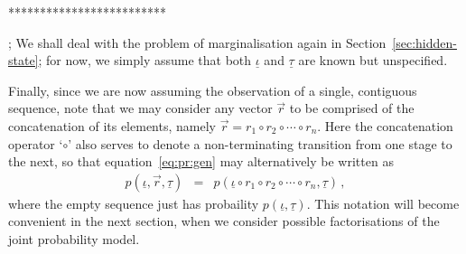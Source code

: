 \documentclass[a4paper]{article}
\newcommand{\ui}{\underline{\iota}}
\newcommand{\ut}{\underline{\tau}}
\begin{document}
*************************

;
We shall deal with the problem of marginalisation again in Section~\ref{sec:hidden-state}; for now, we simply assume that both $\ui$ and
$\ut$ are known but unspecified.

Finally, since we are now assuming the observation of a single, contiguous sequence, note that we may consider any vector $\vec{r}$ 
to be comprised of the concatenation of its elements, namely $\vec{r}=r_1\circ r_2\circ\cdots\circ r_n$. Here the concatenation operator `$\circ$' also serves to
denote a non-terminating transition from one stage to the next, so that equation~\eqref{eq:pr:gen} may alternatively be written as
\begin{eqnarray}
p(\ui,\vec{r},\ut)
& = & p(\ui\circ r_1\circ r_2\circ\cdots\circ r_n,\ut)\,,
\end{eqnarray}
where the empty sequence just has probaility $p(\ui,\ut)$.
This notation will become convenient in the next section, when we consider possible factorisations of the joint probability model.

\end{document}
